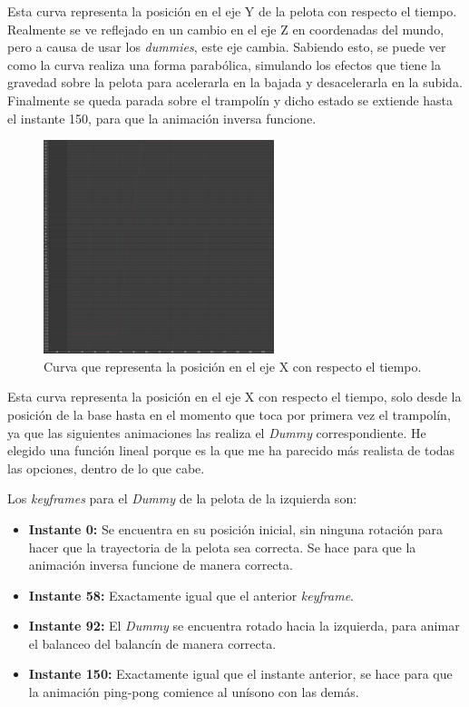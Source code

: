 \documentclass{article}
\begin{document}
Esta curva representa la posición en el eje Y de la pelota con respecto el tiempo. Realmente se ve reflejado en un cambio en el eje Z en coordenadas del mundo, pero a causa de usar los \textit{dummies}, este eje cambia. Sabiendo esto, se puede ver como la curva realiza una forma parabólica, simulando los efectos que tiene la gravedad sobre la pelota para acelerarla en la bajada y desacelerarla en la subida. Finalmente se queda parada sobre el trampolín y dicho estado se extiende hasta el instante 150, para que la animación inversa funcione.

\begin{figure}[H]
   \centering
   \includegraphics[width=0.6\textwidth]{imagenes/curvas/PL/pelota/red.png}
   \caption{Curva que representa la posición en el eje X con respecto el tiempo.}
\end{figure}

Esta curva representa la posición en el eje X con respecto el tiempo, solo desde la posición de la base hasta en el momento que toca por primera vez el trampolín, ya que las siguientes animaciones las realiza el \textit{Dummy} correspondiente. He elegido una función lineal porque es la que me ha parecido más realista de todas las opciones, dentro de lo que cabe. 

\bigskip

Los \textit{keyframes} para el \textit{Dummy} de la pelota de la izquierda son:

\begin{itemize}
    \item \textbf{Instante 0: }Se encuentra en su posición inicial, sin ninguna rotación para hacer que la trayectoria de la pelota sea correcta. Se hace para que la animación inversa funcione de manera correcta.
    \item \textbf{Instante 58: }Exactamente igual que el anterior \textit{keyframe}.
    \item \textbf{Instante 92: }El \textit{Dummy} se encuentra rotado hacia la izquierda, para animar el balanceo del balancín de manera correcta.
    \item \textbf{Instante 150: }Exactamente igual que el instante anterior, se hace para que la animación ping-pong comience al unísono con las demás.
\end{itemize}
\end{document}
